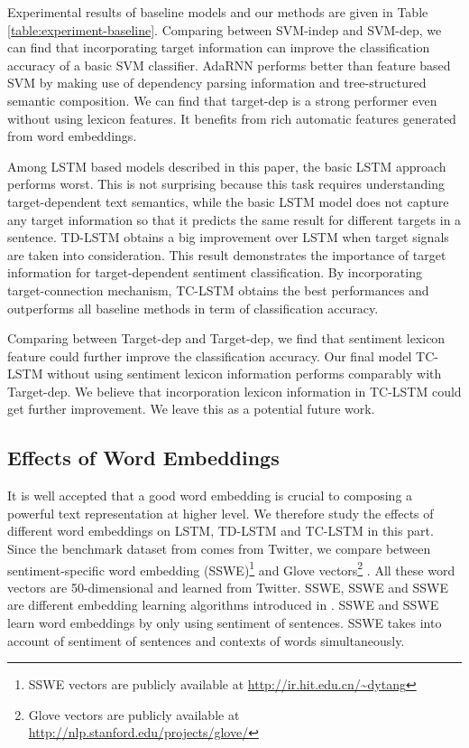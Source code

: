 \documentclass[11pt]{article}
\begin{document}
Experimental results of baseline models and our methods are given in Table \ref{table:experiment-baseline}. 
Comparing between SVM-indep and SVM-dep, we can find that incorporating target information can improve the classification accuracy of a basic SVM classifier. 
AdaRNN performs better than feature based SVM by making use of dependency parsing information and tree-structured semantic composition.
We can find that target-dep is a strong performer even without using lexicon features. It benefits from rich automatic features generated from word embeddings. 


Among LSTM based models described in this paper, the basic LSTM approach performs worst. This is not surprising because this task requires understanding target-dependent text semantics,  while the basic LSTM model does not capture any target information so that it predicts the same result for different targets in a sentence. 
TD-LSTM obtains a big improvement over LSTM when target signals are taken into consideration. This result demonstrates the importance of target information for target-dependent sentiment classification. 
By incorporating target-connection mechanism, TC-LSTM obtains the best performances and outperforms all baseline methods in term of classification accuracy. 

Comparing between Target-dep and Target-dep, we find that sentiment lexicon feature could further improve the classification accuracy. Our final model TC-LSTM without using sentiment lexicon information performs comparably with Target-dep. We believe that incorporation lexicon information in TC-LSTM could get further improvement. We leave this as a potential future work. 

\subsection{Effects of Word Embeddings}
It is well accepted that a good word embedding is crucial to composing a powerful text representation at higher level. 
We therefore study the effects of different word embeddings on LSTM, TD-LSTM and TC-LSTM in this part. 
Since the benchmark dataset from \cite{Dong2014a} comes from Twitter, we compare between sentiment-specific word embedding (SSWE)\footnote{SSWE vectors are publicly available at \url{http://ir.hit.edu.cn/~dytang}} \cite{Tang2014} and Glove vectors\footnote{Glove vectors are publicly available at \url{http://nlp.stanford.edu/projects/glove/}} \cite{Pennington2014}. All these word vectors are 50-dimensional and learned from Twitter. 
SSWE, SSWE and SSWE are different embedding learning algorithms introduced in \cite{Tang2014}. SSWE and SSWE learn word embeddings by only using sentiment of sentences. SSWE takes into account of sentiment of sentences and contexts of words simultaneously.
\end{document}
